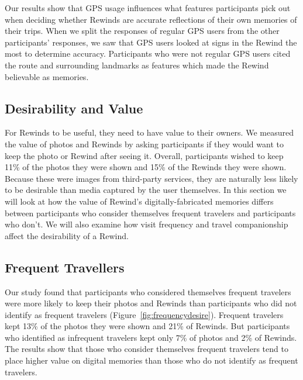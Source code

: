 \documentclass{sigchi}
\begin{document}
Our results show that GPS usage influences what features participants pick out when deciding whether Rewinds are accurate reflections of their own memories of their trips. When we split the responses of regular GPS users from the other participants' responses, we saw that GPS users looked at signs in the Rewind the most to determine accuracy. Participants who were not regular GPS users cited the route and surrounding landmarks as features which made the Rewind believable as memories.

\subsection{Desirability and Value}
For Rewinds to be useful, they need to have value to their owners. We measured the value of photos and Rewinds by asking participants if they would want to keep the photo or Rewind after seeing it. Overall, participants wished to keep 11\% of the photos they were shown and 15\% of the Rewinds they were shown. Because these were images from third-party services, they are naturally less likely to be desirable than media captured by the user themselves. In this section we will look at how the value of Rewind's digitally-fabricated memories differs between participants who consider themselves frequent travelers and participants who don't. We will also examine how visit frequency and travel companionship affect the desirability of a Rewind.


\subsection{Frequent Travellers}
Our study found that participants who considered themselves frequent travelers were more likely to keep their photos and Rewinds than participants who did not identify as frequent travelers (Figure~\ref{fig:frequencydesire}). Frequent travelers kept 13\% of the photos they were shown and 21\% of Rewinds. But participants who identified as infrequent travelers kept only 7\% of photos and 2\% of Rewinds. The results show that those who consider themselves frequent travelers tend to place higher value on digital memories than those who do not identify as frequent travelers.
\end{document}
